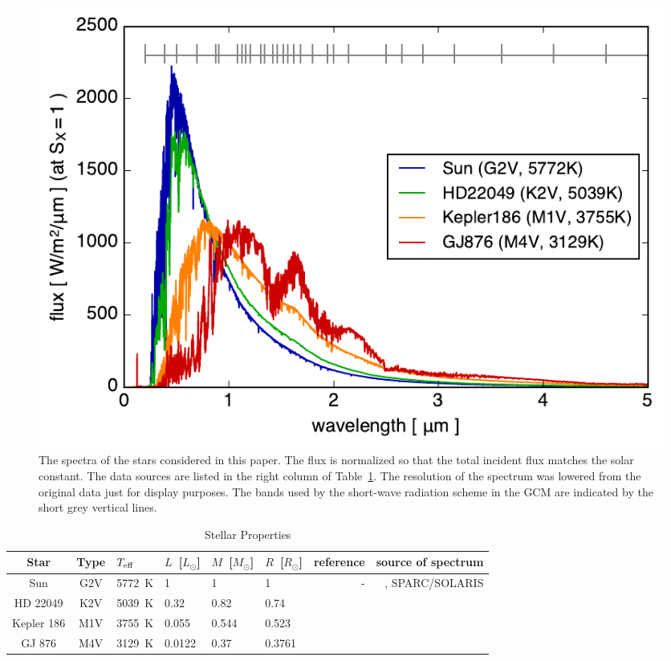 \documentclass[11pt,numberedappendix,twocolappendix,]{emulateapj}
\begin{document}
\begin{figure}[!bh]
    \begin{center}
    \includegraphics[width=\hsize]{fig/star_spectra.pdf}
    \end{center}
\caption{The spectra of the stars considered in this paper. The flux is normalized so that the total incident flux matches the solar constant. The data sources are listed in the right column of Table~\ref{tbl:stellar_properties}. The resolution of the spectrum was lowered from the original data just for display purposes. The bands used by the short-wave radiation scheme in the GCM are indicated by the short grey vertical lines.}
\label{fig:star_spectra}
\end{figure}



\begin{table}[btp]
\caption{Stellar Properties}
\begin{center}
\begin{tabular}{ccllllrr} \hline \hline
%
Star & Type & $T_{\rm eff}$ & $L$~[$L_{\odot}$] & $M$~[$M_{\odot}$] & $R$~[$R_{\odot}$] & reference & source of spectrum \\ \hline
%
Sun & G2V & 5772~K & 1 & 1 & 1 & - & \citet{Lean2005}, SPARC/SOLARIS\footnotemark[1] \\ 
%
HD 22049 & K2V & 5039~K & 0.32 & 0.82 & 0.74 & \citet{Baines2012} & \citet{Segura2003} \\
%
Kepler 186 & M1V & 3755~K & 0.055 & 0.544 & 0.523 & \citet{Torres2015} & \citet{Allard2012} \\
%
GJ 876 & M4V & 3129~K & 0.0122 & 0.37 & 0.3761 & \citet{vonBraun2014} & \citet{Domagal-Goldman2014} \\ \hline
\end{tabular}
\end{center}
\label{tbl:stellar_properties}
\end{table}%
\end{document}

